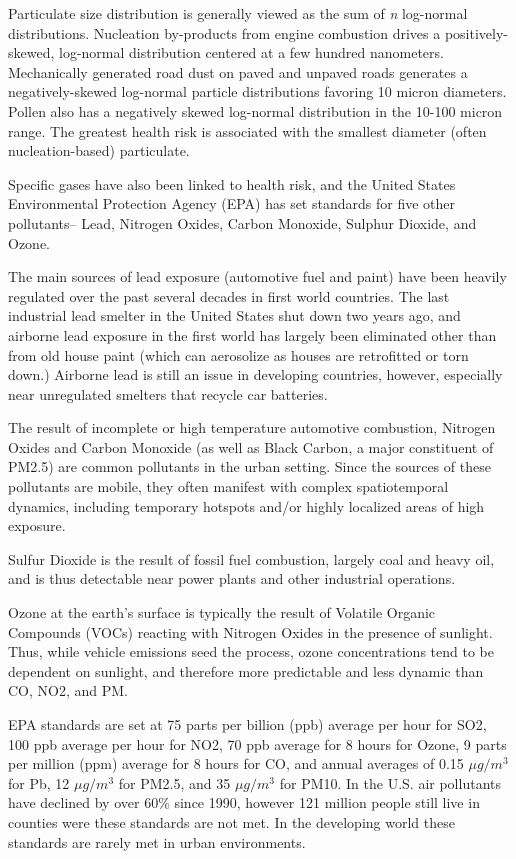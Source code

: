 Particulate size distribution is generally viewed as the sum of \textit{n} log-normal distributions.  \cite{molenar2005} Nucleation by-products from engine combustion drives a positively-skewed, log-normal distribution centered at a few hundred nanometers.  \cite{particulate} Mechanically generated road dust on paved and unpaved roads generates a negatively-skewed log-normal particle distributions favoring 10 micron diameters.  Pollen also has a negatively skewed log-normal distribution in the 10-100 micron range. \cite{particulate} The greatest health risk is associated with the smallest diameter (often nucleation-based) particulate.  

Specific gases have also been linked to health risk, and the United States Environmental Protection Agency (EPA) has set standards for five other pollutants-- Lead, Nitrogen Oxides, Carbon Monoxide, Sulphur Dioxide, and Ozone. \cite{epa2014}

The main sources of lead exposure (automotive fuel and paint) have been heavily regulated over the past several decades in first world countries.  The last industrial lead smelter in the United States shut down two years ago, and airborne lead exposure in the first world has largely been eliminated other than from old house paint (which can aerosolize as houses are retrofitted or torn down.)  Airborne lead is still an issue in developing countries, however, especially near unregulated smelters that recycle car batteries.

The result of incomplete or high temperature automotive combustion, Nitrogen Oxides and Carbon Monoxide (as well as Black Carbon, a major constituent of PM2.5) are common pollutants in the urban setting.  Since the sources of these pollutants are mobile, they often manifest with complex spatiotemporal dynamics, including temporary hotspots and/or highly localized areas of high exposure.

Sulfur Dioxide is the result of fossil fuel combustion, largely coal and heavy oil, and is thus detectable near power plants and other industrial operations. 
  
Ozone at the earth's surface is typically the result of Volatile Organic Compounds (VOCs) reacting with Nitrogen Oxides in the presence of sunlight.  Thus, while vehicle emissions seed the process, ozone concentrations tend to be dependent on sunlight, and therefore more predictable and less dynamic than CO, NO2, and PM.

EPA standards are set at 75 parts per billion (ppb) average per hour for SO2, 100 ppb average per hour for NO2, 70 ppb average for 8 hours for Ozone, 9 parts per million (ppm) average for 8 hours for CO, and annual averages of 0.15 \(\mu g/m^3\) for Pb, 12 \(\mu g/m^3\) for PM2.5, and 35 \(\mu g/m^3\) for PM10. \cite{epa2014}  In the U.S. air pollutants have declined by over 60\% since 1990, however 121 million people still live in counties were these standards are not met. \cite{epa2014}  In the developing world these standards are rarely met in urban environments. 

